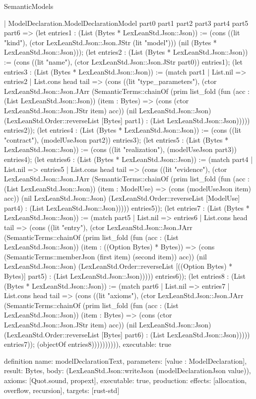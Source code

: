 \begin{lexlean}{SemanticModels}
\begin{semanticmodule}
{    | ModelDeclaration.ModelDeclarationModel part0 part1 part2 part3 part4 part5 part6 => (let entries1 : (List (Bytes * LexLeanStd.Json::Json)) := (cons ((lit "kind"), (ctor LexLeanStd.Json::Json.JStr (lit "model"))) (nil (Bytes * LexLeanStd.Json::Json))); (let entries2 : (List (Bytes * LexLeanStd.Json::Json)) := (cons ((lit "name"), (ctor LexLeanStd.Json::Json.JStr part0)) entries1); (let entries3 : (List (Bytes * LexLeanStd.Json::Json)) := (match part1
      | List.nil => entries2
      | List.cons head tail => (cons ((lit "type_parameters"), (ctor LexLeanStd.Json::Json.JArr (SemanticTerms::chainOf (prim list_fold (fun (acc : (List LexLeanStd.Json::Json)) (item : Bytes) => (cons (ctor LexLeanStd.Json::Json.JStr item) acc)) (nil LexLeanStd.Json::Json) (LexLeanStd.Order::reverseList [Bytes] part1) : (List LexLeanStd.Json::Json))))) entries2)); (let entries4 : (List (Bytes * LexLeanStd.Json::Json)) := (cons ((lit "contract"), (modelUseJson part2)) entries3); (let entries5 : (List (Bytes * LexLeanStd.Json::Json)) := (cons ((lit "realization"), (modelUseJson part3)) entries4); (let entries6 : (List (Bytes * LexLeanStd.Json::Json)) := (match part4
      | List.nil => entries5
      | List.cons head tail => (cons ((lit "evidence"), (ctor LexLeanStd.Json::Json.JArr (SemanticTerms::chainOf (prim list_fold (fun (acc : (List LexLeanStd.Json::Json)) (item : ModelUse) => (cons (modelUseJson item) acc)) (nil LexLeanStd.Json::Json) (LexLeanStd.Order::reverseList [ModelUse] part4) : (List LexLeanStd.Json::Json))))) entries5)); (let entries7 : (List (Bytes * LexLeanStd.Json::Json)) := (match part5
      | List.nil => entries6
      | List.cons head tail => (cons ((lit "entry"), (ctor LexLeanStd.Json::Json.JArr (SemanticTerms::chainOf (prim list_fold (fun (acc : (List LexLeanStd.Json::Json)) (item : ((Option Bytes) * Bytes)) => (cons (SemanticTerms::memberJson (first item) (second item)) acc)) (nil LexLeanStd.Json::Json) (LexLeanStd.Order::reverseList [((Option Bytes) * Bytes)] part5) : (List LexLeanStd.Json::Json))))) entries6)); (let entries8 : (List (Bytes * LexLeanStd.Json::Json)) := (match part6
      | List.nil => entries7
      | List.cons head tail => (cons ((lit "axioms"), (ctor LexLeanStd.Json::Json.JArr (SemanticTerms::chainOf (prim list_fold (fun (acc : (List LexLeanStd.Json::Json)) (item : Bytes) => (cons (ctor LexLeanStd.Json::Json.JStr item) acc)) (nil LexLeanStd.Json::Json) (LexLeanStd.Order::reverseList [Bytes] part6) : (List LexLeanStd.Json::Json))))) entries7)); (objectOf entries8)))))))))),
  executable: true
}

definition{
  name: modelDeclarationText,
  parameters: [value : ModelDeclaration],
  result: Bytes,
  body: (LexLeanStd.Json::writeJson (modelDeclarationJson value)),
  axioms: [Quot.sound, propext],
  executable: true,
  production: {effects: [allocation, overflow, recursion], targets: [rust-std]}
}
\end{semanticmodule}
\end{lexlean}
